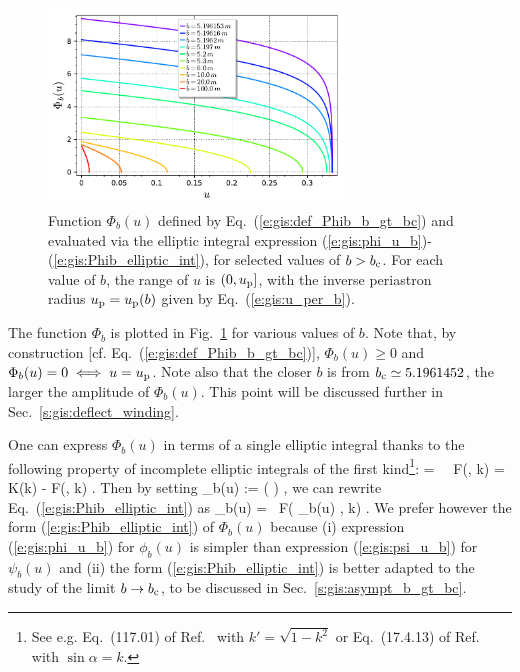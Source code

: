 \begin{figure}
\centerline{\includegraphics[width=0.7\textwidth]{gis_Phib_b_gt_bc.pdf}}
\caption[]{\label{f:gis:Phib_b_gt_bc} \footnotesize
Function $\Phi_b(u)$ defined by Eq.~(\ref{e:gis:def_Phib_b_gt_bc}) and
evaluated via the elliptic integral expression (\ref{e:gis:phi_u_b})-(\ref{e:gis:Phib_elliptic_int}),
for selected values of $b > b_{\rm c}$. For each value of $b$, the range of
$u$ is $(0, u_{\rm p}]$, with the inverse periastron radius $u_{\rm p} = u_{\rm p}(b)$
given by Eq.~(\ref{e:gis:u_per_b}).}
\end{figure}

The function $\Phi_b$ is plotted in Fig.~\ref{f:gis:Phib_b_gt_bc} for
various values of $b$. Note that, by construction [cf. Eq.~(\ref{e:gis:def_Phib_b_gt_bc})],
$\Phi_b(u) \geq 0$ and $\Phi_b(u) = 0 \iff u = u_{\rm p}$. Note also that the closer
$b$ is from $b_{\rm c} \simeq 5.1961452$, the larger the amplitude of $\Phi_b(u)$. This
point will be discussed further in Sec.~\ref{s:gis:deflect_winding}.

\begin{remark}
One can express $\Phi_b(u)$ in terms of a single elliptic integral
thanks to the following property of incomplete elliptic
integrals of the first kind\footnote{See e.g. Eq.~(117.01) of
Ref.~\cite{ByrdF71} with $k' = \sqrt{1-k^2}$
or Eq.~(17.4.13) of Ref.~\cite{AbramS72} with $\sin\alpha = k$.}:
\be \label{e:gis:add_elliptic_int}
   \tan\psi \tan\phi = \ \Longrightarrow \
   F(\psi, k) = K(k) - F(\phi, k) .
\ee
Then by setting
\be \label{e:gis:psi_u_b}
  \psi_b(u) := \arcsin\left(  \right) ,
\ee
we can rewrite Eq.~(\ref{e:gis:Phib_elliptic_int}) as
\be \label{e:gis:Phib_elliptic_int_psi}
     \Phi_b(u) = 
    \, F\left( \psi_b(u) ,\; k\right)  .
\ee
We prefer however the form (\ref{e:gis:Phib_elliptic_int}) of $\Phi_b(u)$
because (i) expression (\ref{e:gis:phi_u_b}) for $\phi_b(u)$ is simpler than
expression (\ref{e:gis:psi_u_b}) for $\psi_b(u)$ and (ii) the form (\ref{e:gis:Phib_elliptic_int}) is better adapted to the study of the limit
$b\to b_{\rm c}$, to be discussed in Sec.~\ref{s:gis:asympt_b_gt_bc}.
\end{remark}

